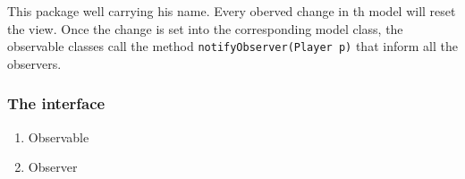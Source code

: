 \documentclass{article}
\begin{document}
This package well carrying his name. Every oberved change in th model will reset the view. Once the change is set into the corresponding model class, the observable classes call the method
\texttt{notifyObserver(Player p)} that inform all the observers.
\subsubsection{The interface}\label{the-interfaces}
\begin{enumerate}
    \item Observable
    \item Observer
\end{enumerate}
\end{document}
